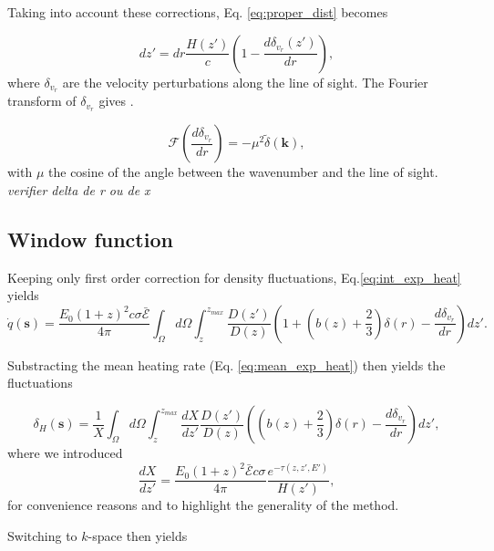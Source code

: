 \documentclass[twocolumns]{emulateapj}
\begin{document}
Taking into account these corrections,  Eq. \ref{eq:proper_dist} becomes

  \begin{equation}
    \label{eq:vel_perturb}
    dz'=dr\frac{H(z')}{c}\left(1-\frac{d\delta_{v_r}(z')}{dr}\right),
  \end{equation}
where $\delta_{v_r}$ are the velocity perturbations along the line of sight.
The Fourier transform of $\delta_{v_r}$ gives  \citep{1987MNRAS.227....1K}.

\begin{equation}
  \label{eq:kaiser2}
  \mathcal{F}\left(\frac{d\delta_{v_r}}{dr}\right)=-\mu^2\tilde{\delta}(\mathbf{k}),
\end{equation}
with $\mu$ the cosine of the angle between the wavenumber and the line of sight.
\textit{verifier delta de r ou de x}

\subsection{Window function }
Keeping only first order correction for density fluctuations, Eq.\ref{eq:int_exp_heat} yields
\begin{equation}
  \label{eq:mean_heat0}
  \dot{q}(\mathbf{s})=\frac{E_0(1+z)^2c\sigma\mathcal{\bar{E}}}{4\pi}\int_{\Omega}d\Omega\int_z^{z_{max}}\frac{D(z')}{D(z)}\left(1+\left(b(z)+\frac{2}{3}\right) \delta(r) -\frac{d\delta_{v_r}}{dr}\right) dz'.
\end{equation}

Substracting the mean heating rate (Eq. \ref{eq:mean_exp_heat}) then yields the fluctuations

\begin{equation}
  \label{eq:heat_fluc0}
  \delta_H(\mathbf{s})=\frac{1}{X}\int_{\Omega}d\Omega\int_z^{z_{max}}\frac{dX}{dz'}\frac{D(z')}{D(z)}\left(\left(b(z)+\frac{2}{3}\right) \delta(r) -\frac{d\delta_{v_r}}{dr}\right)   dz',
\end{equation}
where we introduced
\begin{equation}
  \label{eq:def_X}
  \frac{dX}{dz'}=\frac{E_0(1+z)^2\mathcal{\bar{E}}c\sigma}{4\pi}\frac{e^{-\tau(z,z',E')}}{H(z')},
\end{equation}
for convenience reasons and to highlight the generality of the method.


Switching to $k$-space then yields
\end{document}
